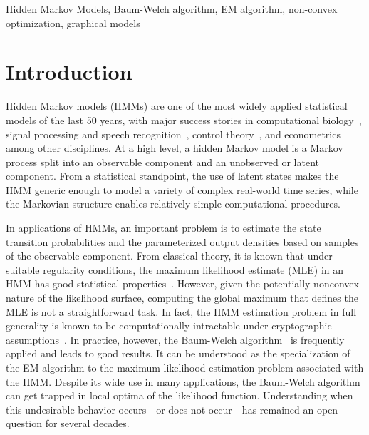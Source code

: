 \documentclass[twoside,11pt]{article}
\begin{document}
\begin{keywords}
  Hidden Markov Models, Baum-Welch algorithm, EM algorithm, non-convex
  optimization, graphical models
\end{keywords}

\section{Introduction}

Hidden Markov models (HMMs) are one of the most widely applied
statistical models of the last 50 years, with major success stories in
computational biology~\citep{durbinbook}, signal processing and speech
recognition~\citep{rabinerbook}, control theory~\citep{controlbook}, and
econometrics~\citep{econbook} among other disciplines.  At a high
level, a hidden Markov model is a Markov process split into an
observable component and an unobserved or latent component.  From a
statistical standpoint, the use of latent states makes the HMM generic
enough to model a variety of complex real-world time series, while
the Markovian structure enables relatively simple computational
procedures.

In applications of HMMs, an important problem is to estimate the state
transition probabilities and the parameterized output densities based
on samples of the observable component.  From classical theory, it is
known that under suitable regularity conditions, the maximum
likelihood estimate (MLE) in an HMM has good statistical
properties~\citep{bickel1998}.
However,
given the potentially nonconvex nature of the likelihood surface,
computing the global maximum that defines the MLE is not a
straightforward task.  In fact, the HMM estimation problem in full
generality is known to be computationally intractable under
cryptographic assumptions~\citep{cryptohmm}.  In practice, however, the
Baum-Welch algorithm~\citep{Baum70} is frequently applied and leads to
good results.  It can be understood as the specialization of the EM
algorithm \citep{Dempster77} to the maximum likelihood estimation
problem associated with the HMM.  Despite its wide use in many
applications, the Baum-Welch algorithm can get trapped in local optima
of the likelihood function.  Understanding when this undesirable
behavior occurs---or does not occur---has remained an open question
for several decades.
\end{document}
